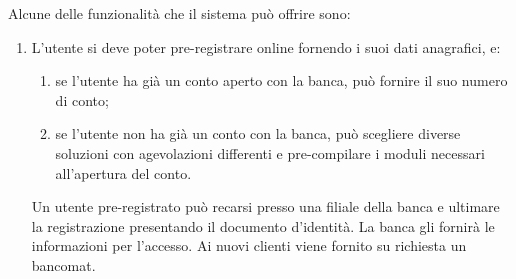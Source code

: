 Alcune delle funzionalit\`a che il sistema pu\`o offrire sono:
\begin{enumerate}
	\item L'utente si deve poter pre-registrare online fornendo i suoi dati anagrafici, e:
		\begin{enumerate}
			\item se l'utente ha gi\`a un conto aperto con la banca, pu\`o fornire il suo numero di conto;
			\item se l'utente non ha gi\`a un conto con la banca, pu\`o scegliere diverse soluzioni con agevolazioni differenti e pre-compilare i moduli necessari all'apertura del conto.
		\end{enumerate}
		Un utente pre-registrato pu\`o recarsi presso una filiale della banca e ultimare la registrazione presentando il documento d'identit\`a.
		La banca gli fornir\`a le informazioni per l'accesso.
		Ai nuovi clienti viene fornito su richiesta un bancomat.


\end{enumerate}
